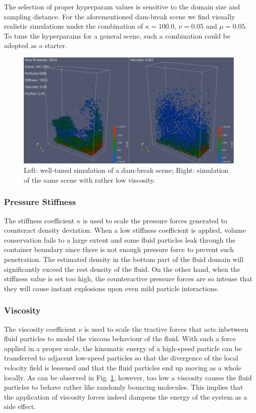 \documentclass[
	11pt, 
	DIV10,
	ngerman,
	a4paper, 
	oneside, 
	headings=normal, 
	captions=tableheading,
	final, 
	numbers=noenddot
]{scrartcl}
\begin{document}
The selection of proper hyperparam values is sensitive to the domain size and sampling distance. For the aforementioned dam-break scene we find visually realistic simulations under the combination of $ \kappa = 100.0 $, $ \nu = 0.05 $ and $ \mu = 0.05 $. To tune the hyperparams for a general scene, such a combination could be adopted as a starter.

\begin{figure}[t]
    \centering
    \includegraphics[width=.6\textwidth]{pics/wcsph_viscosity.png}
    \caption{Left: well-tuned simulation of a dam-break scene; Right: simulation of the same scene with rather low viscosity.}
    \label{fig:visco}
\end{figure}

\subsubsection{Pressure Stiffness}

The stiffness coefficient $ \kappa $ is used to scale the pressure forces generated to counteract density deviation. When a low stiffness coefficient is applied, volume conservation fails to a large extent and some fluid particles leak through the container boundary since there is not enough pressure force to prevent such penetration. The estimated density in the bottom part of the fluid domain will significantly exceed the rest density of the fluid. On the other hand, when the stiffness value is set too high, the counteractive pressure forces are so intense that they will cause instant explosions upon even mild particle interactions.

\subsubsection{Viscosity}

The viscosity coefficient $ \nu $ is used to scale the tractive forces that acts inbetween fluid particles to model the viscous behaviour of the fluid. With such a force applied in a proper scale, the kinematic energy of a high-speed particle can be transferred to adjacent low-speed particles so that the divergence of the local velocity field is lessened and that the fluid particles end up moving as a whole locally. As can be observed in Fig. \ref{fig:visco}, however, too low a viscosity causes the fluid particles to behave rather like randomly bouncing molecules. This implies that the application of viscosity forces indeed dampens the energy of the system as a side effect.
\end{document}

